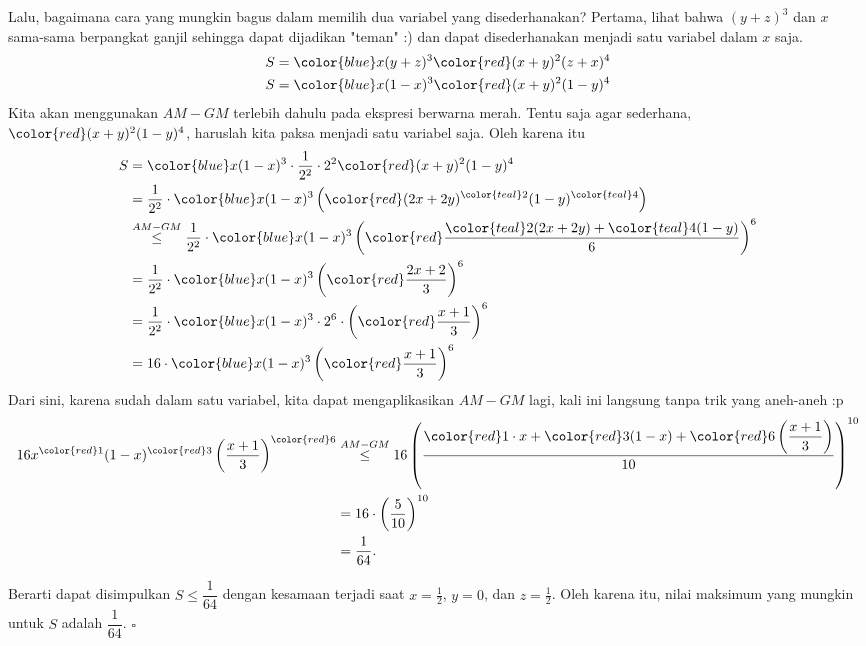 Lalu, bagaimana cara yang mungkin bagus dalam memilih dua variabel yang disederhanakan? Pertama, lihat bahwa $(y+z)^3$ dan $x$ sama-sama berpangkat ganjil sehingga dapat dijadikan "teman" :) dan dapat disederhanakan menjadi satu variabel dalam $x$ saja.
\begin{align*}
S&={\color{blue}x(y+z)^3}{\color{red}(x+y)^2(z+x)^4}\\
S&={\color{blue}x(1-x)^3}{\color{red}(x+y)^2(1-y)^4}
\end{align*}
Kita akan menggunakan $AM-GM$ terlebih dahulu pada ekspresi berwarna merah. Tentu saja agar sederhana, ${\color{red}(x+y)^2(1-y)^4}$, haruslah kita paksa menjadi satu variabel saja. Oleh karena itu
\allowdisplaybreaks
\begin{align*}
S&= {\color{blue}x(1-x)^3}\cdot\frac{1}{2^2}\cdot{2^2\color{red}(x+y)^2(1-y)^4}\\
&= \frac{1}{2^2}\cdot{\color{blue}x(1-x)^3}\left({\color{red}(2x+2y)^{\color{teal}2}(1-y)^{\color{teal}4}}\right)\\
&\overset{AM-GM}{\le} \frac{1}{2^2}\cdot{\color{blue}x(1-x)^3}\left({\color{red}\dfrac{{\color{teal}2}(2x+2y)+{\color{teal}4}(1-y)}{6}}\right)^6\\
&=\frac{1}{2^2}\cdot{\color{blue}x(1-x)^3}\left({\color{red}\dfrac{2x+2}{3}}\right)^6\\
&=\frac{1}{2^2}\cdot{\color{blue}x(1-x)^3}\cdot2^6\cdot\left({\color{red}\dfrac{x+1}{3}}\right)^6\\
&=16\cdot{\color{blue}x(1-x)^3}\left({\color{red}\dfrac{x+1}{3}}\right)^6
\end{align*}
\newpage
Dari sini, karena sudah dalam satu variabel, kita dapat mengaplikasikan $AM-GM$ lagi, kali ini langsung tanpa trik yang aneh-aneh :p
\begin{align*}
16x^{\color{red}1}(1-x)^{\color{red}3}\left(\dfrac{x+1}{3}\right)^{\color{red}6}
&\overset{AM-GM}{\le} 16\left(\dfrac{{\color{red}1}\cdot x + {\color{red}3}(1-x) + {\color{red}6} \left(\dfrac{x+1}{3}\right)}{10}\right)^{10}\\
&=16\cdot\left(\dfrac{5}{10}\right)^{10}\\
&= \dfrac{1}{64}.
\end{align*}

Berarti dapat disimpulkan $S \le \dfrac{1}{64}$ dengan kesamaan terjadi saat $x=\frac{1}{2}$, $y=0$, dan $z=\frac{1}{2}$. Oleh karena itu, nilai maksimum yang mungkin untuk $S$ adalah $\boxed{\dfrac{1}{64}}$. $\square$

